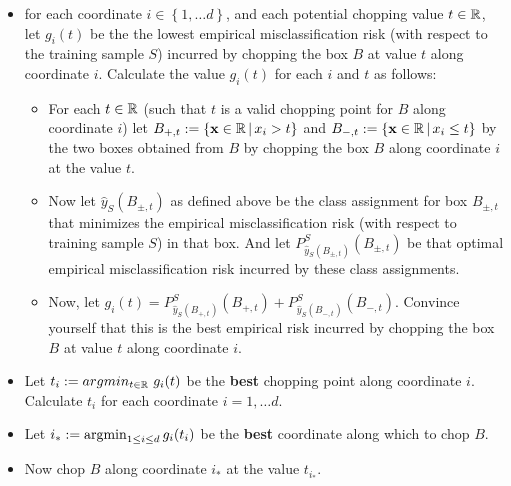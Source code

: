 \documentclass[11pt]{article}
\newcommand{\VV}[1]{\mathbf{#1}}
\begin{document}
\begin{itemize}
  \item for each coordinate $i\in\left\{ 1,\ldots d \right\}$, and each
    potential chopping value $t\in\mathbb{R}$, let $g_i(t)$ be the 
    the lowest empirical misclassification risk (with respect to the training
    sample $S$) incurred by
      chopping the box $B$ at value $t$ along coordinate $i$.
      Calculate the value $g_i(t)$ for each $i$ and $t$ as follows: 
    \begin{itemize}
      \item For each $t\in\mathbb{R}$ (such that $t$ is a valid chopping point for
	$B$ along coordinate $i$) let 
	$B_{+,t} := \left\{ \VV{x}\in\reals\,|\, x_{i}>t \right\}$ 
	and 
	$B_{-,t} := \left\{ \VV{x}\in\reals\,|\, x_{i}\leq t \right\}$ 
	by the two boxes obtained from $B$ by chopping the box $B$ along
	coordinate $i$ at the value $t$. 
      \item Now let $\hat{y}_S(B_{\pm,t})$ as defined above be the class assignment
	for box $B_{\pm,t}$ that minimizes the empirical misclassification risk (with respect to
	training sample $S$) in that box. And let 
      $P^S_{\hat{y}_S(B_{\pm,t})}(B_{\pm,t})$ be that optimal empirical
      misclassification risk incurred by these class assignments.
    \item Now, let $g_i(t) = P^S_{\hat{y}_S(B_{+,t})}(B_{+,t}) +
      P^S_{\hat{y}_S(B_{-,t})}(B_{-,t})$. Convince yourself that this is
      the best empirical risk incurred by
      chopping the box $B$ at value $t$ along coordinate $i$. 
    \end{itemize}
  \item Let $t_i := argmin_{t\in\mathbb{R}}\,\, g_i(t)$ be the {\bf best} chopping point along
    coordinate $i$. Calculate $t_i$ for each coordinate $i=1,\ldots d$.
  \item Let $i_* := \operatorname*{argmin}_{1\leq i \leq d} g_i(t_i)$ be the {\bf best} coordinate along which to chop $B$.
  \item Now chop $B$ along coordinate $i_*$ at the value $t_{i_*}$.
\end{itemize}
\end{document}
